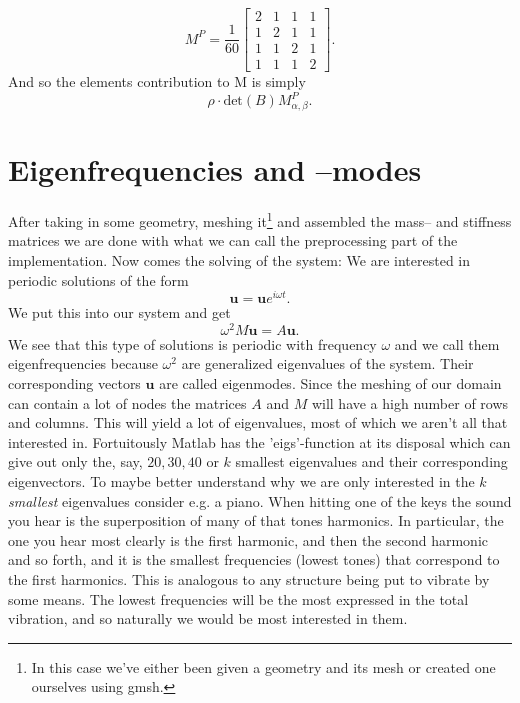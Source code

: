 \documentclass[paper=a4, fontsize=11pt]{scrartcl} %
\begin{document}
\begin{equation*}
M^P = \frac{1}{60}\begin{bmatrix}
2 & 1 & 1 & 1 \\
1 & 2 & 1 & 1 \\
1 & 1 & 2 & 1 \\
1 & 1 & 1 & 2
\end{bmatrix}.
\end{equation*}
And so the elements contribution to M is simply
\begin{equation}
\rho\cdot \text{det}(B)M^P_{\alpha,\beta}.
\end{equation}

\section*{Eigenfrequencies and --modes}

After taking in some geometry, meshing it\footnote{In this case we've either been given a geometry and its mesh or created one ourselves using gmsh.} and assembled the mass-- and stiffness matrices we are done with what we can call the preprocessing part of the implementation. Now comes the solving of the system: We are interested in periodic solutions of the form
\begin{equation*}
\boldsymbol{u} = \boldsymbol{u}e^{i\omega t}.
\end{equation*}
We put this into our system and get
\begin{equation}
\omega^2M\boldsymbol{u} = A\boldsymbol{u}.
\label{eigenGeneralized}
\end{equation}
We see that this type of solutions is periodic with frequency $\omega$ and we call them eigenfrequencies because $\omega^2$ are generalized eigenvalues of the system. Their corresponding vectors $\boldsymbol{u}$ are called eigenmodes. Since the meshing of our domain can contain a lot of nodes the matrices $A$ and $M$ will have a high number of rows and columns. This will yield a lot of eigenvalues, most of which we aren't all that interested in. Fortuitously Matlab has the 'eigs'-function at its disposal which can give out only the, say, $20, 30, 40$ or $k$ smallest eigenvalues and their corresponding eigenvectors. To maybe better understand why we are only interested in the $k$ \textit{smallest} eigenvalues consider e.g. a piano. When hitting one of the keys the sound you hear is the superposition of many of that tones harmonics. In particular, the one you hear most clearly is the first harmonic, and then the second harmonic and so forth, and it is the smallest frequencies (lowest tones) that correspond to the first harmonics. This is analogous to any structure being put to vibrate by some means. The lowest frequencies will be the most expressed in the total vibration, and so naturally we would be most interested in them.
\end{document}
